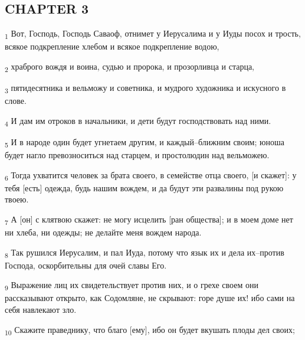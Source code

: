 \subsection{CHAPTER 3}
\begin{tcolorbox}
\textsubscript{1} Вот, Господь, Господь Саваоф, отнимет у Иерусалима и у Иуды посох и трость, всякое подкрепление хлебом и всякое подкрепление водою,
\end{tcolorbox}
\begin{tcolorbox}
\textsubscript{2} храброго вождя и воина, судью и пророка, и прозорливца и старца,
\end{tcolorbox}
\begin{tcolorbox}
\textsubscript{3} пятидесятника и вельможу и советника, и мудрого художника и искусного в слове.
\end{tcolorbox}
\begin{tcolorbox}
\textsubscript{4} И дам им отроков в начальники, и дети будут господствовать над ними.
\end{tcolorbox}
\begin{tcolorbox}
\textsubscript{5} И в народе один будет угнетаем другим, и каждый--ближним своим; юноша будет нагло превозноситься над старцем, и простолюдин над вельможею.
\end{tcolorbox}
\begin{tcolorbox}
\textsubscript{6} Тогда ухватится человек за брата своего, в семействе отца своего, [и скажет]: у тебя [есть] одежда, будь нашим вождем, и да будут эти развалины под рукою твоею.
\end{tcolorbox}
\begin{tcolorbox}
\textsubscript{7} А [он] с клятвою скажет: не могу исцелить [ран общества]; и в моем доме нет ни хлеба, ни одежды; не делайте меня вождем народа.
\end{tcolorbox}
\begin{tcolorbox}
\textsubscript{8} Так рушился Иерусалим, и пал Иуда, потому что язык их и дела их--против Господа, оскорбительны для очей славы Его.
\end{tcolorbox}
\begin{tcolorbox}
\textsubscript{9} Выражение лиц их свидетельствует против них, и о грехе своем они рассказывают открыто, как Содомляне, не скрывают: горе душе их! ибо сами на себя навлекают зло.
\end{tcolorbox}
\begin{tcolorbox}
\textsubscript{10} Скажите праведнику, что благо [ему], ибо он будет вкушать плоды дел своих;
\end{tcolorbox}
